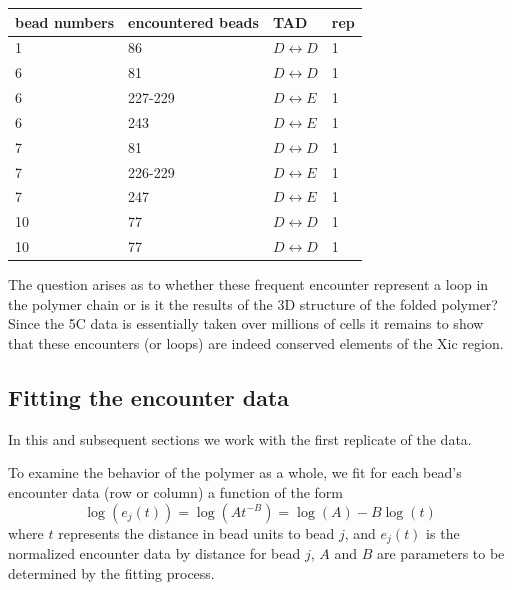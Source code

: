 \documentclass[12pt]{paper}
\begin{document}
\begin{table}[H]
\begin{tabular}{l l l l}
bead numbers & encountered beads & TAD & rep\\
\hline
1       & 86      & $D\leftrightarrow D$& 1 \\
6       & 81      & $D\leftrightarrow D$& 1 \\
6       & 227-229 & $D\leftrightarrow E$& 1 \\
6       & 243     & $D\leftrightarrow E$& 1 \\
7       & 81      & $D\leftrightarrow D$& 1 \\
7       & 226-229 & $D\leftrightarrow E$& 1 \\
7       & 247     & $D\leftrightarrow E$& 1 \\
10      & 77      & $D\leftrightarrow D$& 1 \\
10      & 77      & $D\leftrightarrow D$& 1 \\

\end{tabular}
\end{table}

The question arises as to whether these frequent encounter represent a loop in the polymer chain or is it the results of the 3D structure of the folded polymer? Since the 5C data is essentially taken over millions of cells it remains to show that these encounters (or loops) are indeed conserved elements of the Xic region.

\subsection{Fitting the encounter data}
In this and subsequent sections we work with the first replicate of the data.

To examine the behavior of the polymer as a whole, we fit for each bead's encounter data 
(row or column) a function of the form 
\begin{equation}\label{fitModel}
\log(e_j(t))= \log(At^{-B})= \log(A)-B\log(t)
\end{equation}
where $t$ represents the distance in bead units to bead $j$, and $e_j(t)$ is the normalized encounter data by distance for bead $j$, $A$ and $B$ are parameters to be determined by the fitting process. 
\end{document}
